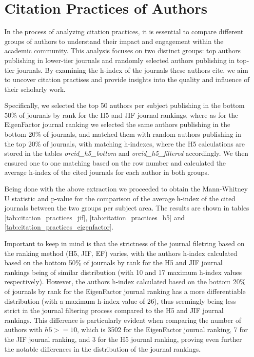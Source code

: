 \section{Citation Practices of Authors}

In the process of analyzing citation practices, it is essential to compare
different groups of authors to understand their impact and engagement within
the academic community. This analysis focuses on two distinct groups: top
authors publishing in lower-tier journals and randomly selected authors
publishing in top-tier journals. By examining the h-index of the journals these
authors cite, we aim to uncover citation practises and provide insights into
the quality and influence of their scholarly work.

Specifically, we selected the top 50 authors per subject publishing in the
bottom 50\% of journals by rank for the H5 and JIF journal rankings, where as
for the EigenFactor journal ranking we selected the same authors
publishing in the bottom 20\% of journals, and matched them with random
authors publishing in the top 20\% of journals, with matching h-indexes, where
the H5 calculations are stored in the tables \emph{orcid\_h5\_bottom} and
\emph{orcid\_h5\_filtered} accordingly. We then ensured one to one matching
based on the row number and calculated the average h-index of the cited
journals for each author in both groups.

Being done with the above extraction we proceeded to obtain the Mann-Whitney U
statistic and p-value for the comparison of the average h-index of the cited
journals between the two groups per subject area. The results are shown in
tables \ref{tab:citation_practices_jif}, \ref{tab:citation_practices_h5} and
\ref{tab:citation_practices_eigenfactor}.

Important to keep in mind is that the strictness of the journal filetring based
on the ranking method (H5, JIF, EF) varies, with the authors h-index
calculated based on the bottom 50\% of journals by rank for the H5 and JIF
journal rankings being of similar distribution (with 10 and 17 maximum h-index
values respectively). However, the authors h-index calculated based on the bottom
20\% of journals by rank for the EigenFactor journal ranking has a more differentiable
distribution (with a maximum h-index value of 26), thus seemingly being less
strict in the journal filtering process compared to the H5 and JIF journal
rankings. This difference is particularly evident when comparing the number of
authors with $h5 >= 10$, which is 3502 for the EigenFactor journal ranking, 7 for
the JIF journal ranking, and 3 for the H5 journal ranking, proving even further
the notable differences in the distribution of the journal rankings.

